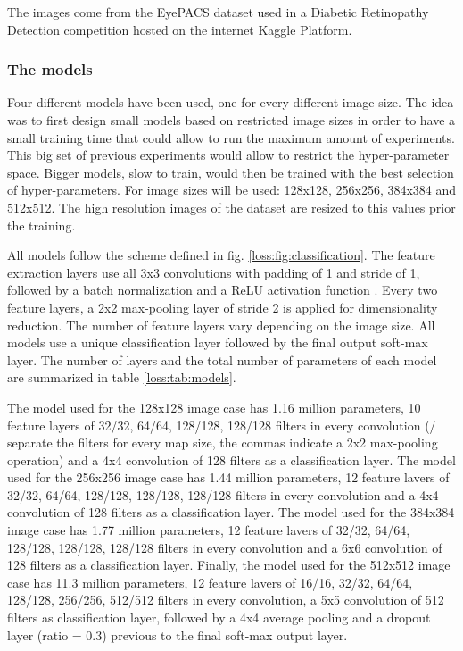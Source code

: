 The images come from the EyePACS dataset used in a Diabetic Retinopathy Detection competition hosted on the internet Kaggle Platform.

\subsubsection{The models}

Four different models have been used, one for every different image size. The idea was to first design small models based on restricted image sizes in order to have a small training time that could allow to run the maximum amount of experiments. This big set of previous experiments would allow to restrict the hyper-parameter space. Bigger models, slow to train, would then be trained with the best selection of hyper-parameters. For image sizes will be used: 128x128, 256x256, 384x384 and 512x512. The high resolution images of the dataset are resized to this values prior the training.

All models follow the scheme defined in fig. \ref{loss:fig:classification}. The feature extraction layers use all 3x3 convolutions with padding of 1 and stride of 1, followed by a batch normalization\citep{batch-norm} and a ReLU activation function \citep{Dahl2013}. Every two feature layers, a 2x2 max-pooling layer of stride 2 is applied for dimensionality reduction. The number of feature layers vary depending on the image size. All models use a unique classification layer followed by the final output soft-max layer. The number of layers and the total number of parameters of each model are summarized in table \ref{loss:tab:models}.

The model used for the 128x128 image case has 1.16 million parameters, 10 feature layers of 32/32, 64/64, 128/128, 128/128 filters in every convolution (/ separate the filters for every map size, the commas indicate a 2x2 max-pooling operation) and a 4x4 convolution of 128 filters as a classification layer. The model used for the 256x256 image case has 1.44 million parameters, 12 feature lavers of 32/32, 64/64, 128/128, 128/128, 128/128 filters in every convolution and a 4x4 convolution of 128 filters as a classification layer. The model used for the 384x384 image case has 1.77 million parameters, 12 feature lavers of 32/32, 64/64, 128/128, 128/128, 128/128 filters in every convolution and a 6x6 convolution of 128 filters as a classification layer. Finally, the model used for the 512x512 image case has 11.3 million parameters, 12 feature lavers of 16/16, 32/32, 64/64, 128/128, 256/256, 512/512 filters in every convolution, a 5x5 convolution of 512 filters as classification layer, followed by a 4x4 average pooling and a dropout layer (ratio = 0.3) previous to the final soft-max output layer.


